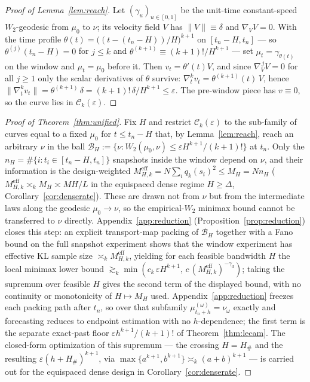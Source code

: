 \documentclass[11pt]{article}
\theoremstyle{definition}
\theoremstyle{remark}
\newcommand{\Ck}{\mathcal{C}_k(\varepsilon)}
\begin{document}
\begin{proof}[Proof of Lemma~\ref{lem:reach}]
Let $(\gamma_u)_{u\in[0,1]}$ be the unit-time constant-speed $W_2$-geodesic from $\mu_0$ to
$\nu$; its velocity field $V$ has $\|V\|\equiv\delta$ and $\nabla_V V=0$. With the time profile
$\theta(t)=\big((t-(t_n-H))/H\big)^{k+1}$ on $[t_n-H,t_n]$ --- so $\theta^{(j)}(t_n-H)=0$ for
$j\le k$ and $\theta^{(k+1)}\equiv(k+1)!/H^{k+1}$ --- set $\mu_t=\gamma_{\theta(t)}$ on the window
and $\mu_t=\mu_0$ before it. Then $v_t=\theta'(t)V$, and since $\nabla_V^{\,j}V=0$ for all
$j\ge1$ only the scalar derivatives of $\theta$ survive: $\nabla_t^k v_t=\theta^{(k+1)}(t)\,V$,
hence $\|\nabla_t^k v_t\|=\theta^{(k+1)}\,\delta=(k+1)!\,\delta/H^{k+1}\le\varepsilon$. The
pre-window piece has $v\equiv0$, so the curve lies in $\Ck$.
\end{proof}

\begin{proof}[Proof of Theorem~\ref{thm:unified}]
Fix $H$ and restrict $\Ck$ to the sub-family of curves equal to a fixed $\mu_0$ for
$t\le t_n-H$ that, by Lemma~\ref{lem:reach}, reach an arbitrary $\nu$ in the ball
$\mathcal B_H:=\{\nu:W_2(\mu_0,\nu)\le\varepsilon H^{k+1}/(k+1)!\}$ at $t_n$. Only the
$n_H=\#\{i:t_i\in[t_n-H,t_n]\}$ snapshots inside the window depend on $\nu$, and their information is
the design-weighted $M^{\mathrm{eff}}_{H,k}=N\sum_i q_k(s_i)^2\le M_H=Nn_H$
($M^{\mathrm{eff}}_{H,k}\asymp_k M_H\asymp MH/L$ in the equispaced dense regime $H\ge\Delta$,
Corollary~\ref{cor:denserate}). These are drawn not from $\nu$ but from the intermediate laws along the geodesic
$\mu_0\to\nu$, so the empirical-$W_2$ minimax bound cannot be transferred to $\nu$ directly.
Appendix~\ref{app:reduction} (Proposition~\ref{prop:reduction}) closes this step: an explicit
transport-map packing of $\mathcal B_H$ together with a Fano bound on the full snapshot experiment
shows that the window experiment has effective KL sample size $\asymp_k M^{\mathrm{eff}}_{H,k}$,
yielding for each feasible bandwidth $H$ the local minimax lower bound
$\gtrsim_k\min(c_k\,\varepsilon H^{k+1},\,c\,(M^{\mathrm{eff}}_{H,k})^{-\gamma_d})$; taking the supremum over feasible $H$
gives the second term of the displayed bound, with no continuity or monotonicity of $H\mapsto M_H$
used. Appendix~\ref{app:reduction} freezes each packing path after
$t_n$, so over that subfamily $\mu_{t_n+h}^{(\omega)}=\nu_\omega$ exactly and forecasting reduces to
endpoint estimation with no $h$-dependence; the first term is the separate exact-past floor
$\varepsilon h^{k+1}/(k+1)!$ of Theorem~\ref{thm:lecam}. The closed-form optimization of this
supremum --- the crossing $H=H_\#$ and the resulting $\varepsilon(h+H_\#)^{k+1}$, via
$\max\{a^{k+1},b^{k+1}\}\asymp_k(a+b)^{k+1}$ --- is carried out for the equispaced dense design in
Corollary~\ref{cor:denserate}.
\end{proof}
\end{document}
